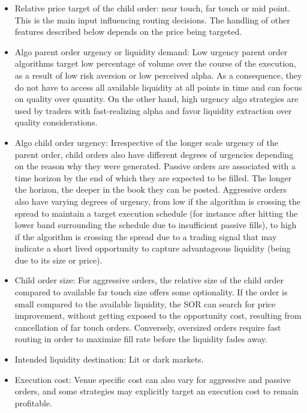 \begin{itemize}
\item Relative price target of the child order: near touch, far touch or mid point. This is the main input influencing routing decisions. The handling of other features described below depends on the price being targeted.

\item Algo parent order urgency or liquidity demand: Low urgency parent order algorithms target low percentage of volume over the course of the execution, as a result of low risk aversion or low perceived alpha. As a consequence, they do not have to access all available liquidity at all points in time and can focus on quality over quantity. On the other hand, high urgency algo strategies are used by traders with fast-realizing alpha and favor liquidity extraction over quality considerations.

\item Algo child order urgency: Irrespective of the longer scale urgency of the parent order, child orders also have different degrees of urgencies depending on the reason why they were generated. Passive orders are associated with a time horizon by the end of which they are expected to be filled. The longer the horizon, the deeper in the book they can be posted. Aggressive orders also have varying degrees of urgency, from low if the algorithm is crossing the spread to maintain a target execution schedule (for instance after hitting the lower band surrounding the schedule due to insufficient passive fills), to high if the algorithm is crossing the spread due to a trading signal that may indicate a short lived opportunity to capture advantageous liquidity (being due to its size or price).

\item Child order size: For aggressive orders, the relative size of the child order compared to available far touch size offers some optionality. If the order is small compared to the available liquidity, the SOR can search for price improvement, without getting exposed to the opportunity cost, resulting from cancellation of far touch orders. Conversely, oversized orders require fast routing in order to maximize fill rate before the liquidity fades away.

\item Intended liquidity destination: Lit or dark markets.

\item Execution cost: Venue specific cost can also vary for aggressive and passive orders, and some strategies may explicitly target an execution cost to remain profitable. \twomedskip
\end{itemize}


